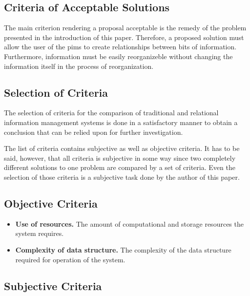 \subsection{Criteria of Acceptable Solutions}

The main criterion rendering a proposal acceptable is the remedy of the problem
presented in the introduction of this paper. Therefore, a proposed solution
must allow the user of the \gls{pims} to create relationships between bits of
information. Furthermore, information must be easily reorganizeble without
changing the information itself in the process of reorganization.

\iffalse
\subsection{Selection of Criteria}

The selection of criteria for the comparison of traditional and relational information management systems is done in a satisfactory manner to obtain a conclusion that can be relied upon for further investigation.

The list of criteria contains subjective as well as objective criteria. It has to be said, however, that all criteria is subjective in some way since two completely different solutions to one problem are compared by a set of criteria. Even the selection of those criteria is a subjective task done by the author of this paper.

\subsection{Objective Criteria}

\begin{itemize}
\item \textbf{Use of resources.} The amount of computational and storage resources the system requires.
\item \textbf{Complexity of data structure.} The complexity of the data structure required for operation of the system.
\end{itemize}

\subsection{Subjective Criteria}

